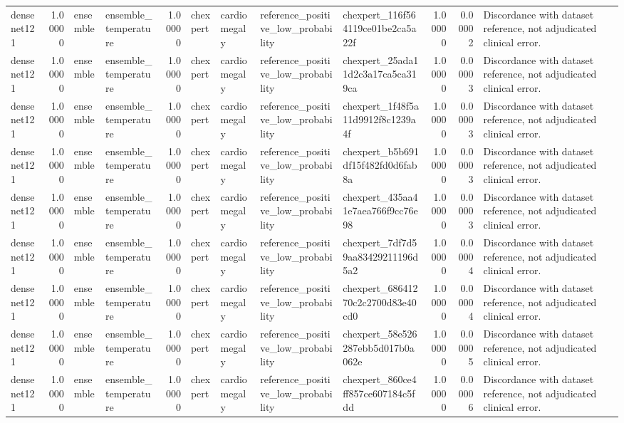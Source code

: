\begin{tabular}{lrllrllllrrl}
densenet121 & 1.00000 & ensemble & ensemble\_temperature & 1.00000 & chexpert & cardiomegaly & reference\_positive\_low\_probability & chexpert\_116f564119ce01be2ca5a22f & 1.00000 & 0.00002 & Discordance with dataset reference, not adjudicated clinical error. \\
densenet121 & 1.00000 & ensemble & ensemble\_temperature & 1.00000 & chexpert & cardiomegaly & reference\_positive\_low\_probability & chexpert\_25ada11d2c3a17ca5ca319ca & 1.00000 & 0.00003 & Discordance with dataset reference, not adjudicated clinical error. \\
densenet121 & 1.00000 & ensemble & ensemble\_temperature & 1.00000 & chexpert & cardiomegaly & reference\_positive\_low\_probability & chexpert\_1f48f5a11d9912f8c1239a4f & 1.00000 & 0.00003 & Discordance with dataset reference, not adjudicated clinical error. \\
densenet121 & 1.00000 & ensemble & ensemble\_temperature & 1.00000 & chexpert & cardiomegaly & reference\_positive\_low\_probability & chexpert\_b5b691df15f482fd0d6fab8a & 1.00000 & 0.00003 & Discordance with dataset reference, not adjudicated clinical error. \\
densenet121 & 1.00000 & ensemble & ensemble\_temperature & 1.00000 & chexpert & cardiomegaly & reference\_positive\_low\_probability & chexpert\_435aa41e7aea766f9cc76e98 & 1.00000 & 0.00003 & Discordance with dataset reference, not adjudicated clinical error. \\
densenet121 & 1.00000 & ensemble & ensemble\_temperature & 1.00000 & chexpert & cardiomegaly & reference\_positive\_low\_probability & chexpert\_7df7d59aa83429211196d5a2 & 1.00000 & 0.00004 & Discordance with dataset reference, not adjudicated clinical error. \\
densenet121 & 1.00000 & ensemble & ensemble\_temperature & 1.00000 & chexpert & cardiomegaly & reference\_positive\_low\_probability & chexpert\_68641270c2c2700d83e40cd0 & 1.00000 & 0.00004 & Discordance with dataset reference, not adjudicated clinical error. \\
densenet121 & 1.00000 & ensemble & ensemble\_temperature & 1.00000 & chexpert & cardiomegaly & reference\_positive\_low\_probability & chexpert\_58e526287ebb5d017b0a062e & 1.00000 & 0.00005 & Discordance with dataset reference, not adjudicated clinical error. \\
densenet121 & 1.00000 & ensemble & ensemble\_temperature & 1.00000 & chexpert & cardiomegaly & reference\_positive\_low\_probability & chexpert\_860ce4ff857ce607184c5fdd & 1.00000 & 0.00006 & Discordance with dataset reference, not adjudicated clinical error. \\

\end{tabular}
